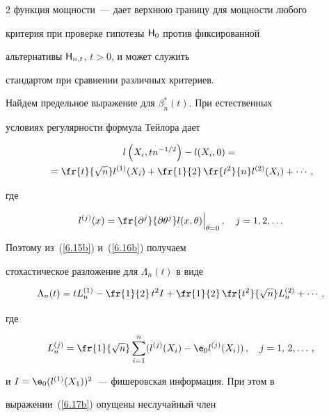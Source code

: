 \begin{multicols}{2}
функция мощности~--- дает верхнюю границу для мощности любого


критерия при проверке гипотезы ${\sf H}_0$ против фиксированной


альтернативы ${\sf H}_{n,t}$, $t>0$, и может служить


стандартом при сравнении различных критериев.





Найдем предельное выражение для $\beta_n^*(t)$. При естественных


условиях регулярности формула Тейлора дает


\begin{multline}


l\left (X_i,tn^{-1/2}\right )-l(X_i,0) = {}\\


{}=


\fr{t}{\sqrt{n}}l^{(1)}(X_i)+\fr{1}{2}\,\fr{t^2}{n}l^{(2)}(X_i)+\cdots


\,,


\label{6.16b}


\end{multline}


где


$$


l^{(j)}(x) = \fr{\partial^j}{\partial\theta^j}l(x,\theta)\Bigr|_{\theta =


0}\,,\quad j = 1, 2, \ldots


$$


Поэтому из~(\ref{6.15b}) и~(\ref{6.16b}) получаем


стохастическое разложение для $\Lambda_n(t)$ в виде


\begin{equation}


\Lambda_n(t) = tL_n^{(1)} - \fr{1}{2}\,t^2I +


\fr{1}{2}\,\fr{t^2}{\sqrt{n}}L_n^{(2)} + \cdots\,, \label{6.17b}


\end{equation}


где


$$


L_n^{(j)} = \fr{1}{\sqrt{n}}\sum_{i=1}^{n}(l^{(j)}(X_i)-{\e}_{0}l^{(j)}(X_i))\,,\quad


 j = 1,\,2, \ldots \,,


$$


и $ I = {\e}_{0}(l^{(1)}(X_1))^2$~--- фишеровская информация. При этом в


выражении~(\ref{6.17b}) опущены неслучайный член



\end{multicols}
